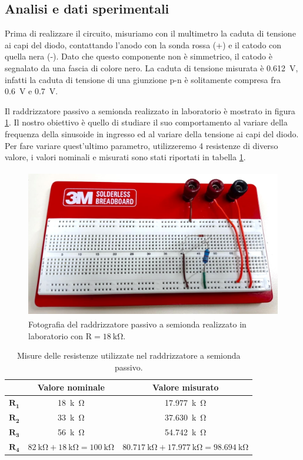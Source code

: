 \documentclass{report}
\begin{document}
\subsection{Analisi e dati sperimentali}
Prima di realizzare il circuito, misuriamo con il multimetro la caduta di tensione ai capi del diodo, contattando l'anodo con la sonda rossa (+) e il catodo con quella nera (-). Dato che questo componente non è simmetrico, il catodo è segnalato da una fascia di colore nero. La caduta di tensione misurata è \SI{0.612}{\volt}, infatti la caduta di tensione di una giunzione p-n è solitamente compresa fra \SI{0.6}{\volt} e \SI{0.7}{\volt}. \par
Il raddrizzatore passivo a semionda realizzato in laboratorio è mostrato in figura \ref{figura:circuito1}. Il nostro obiettivo è quello di studiare il suo comportamento al variare della frequenza della sinusoide in ingresso ed al variare della tensione ai capi del diodo. Per fare variare quest'ultimo parametro, utilizzeremo 4 resistenze di diverso valore, i valori nominali e misurati sono stati riportati in tabella \ref{table:misure1}. \par
\begin{figure}[h!]
	\centering
	\includegraphics[height=6.5cm]{immagini/circuito1}
	\caption{Fotografia del raddrizzatore passivo a semionda realizzato in laboratorio con $\displaystyle\mathrm{R=\SI{18}{k\ohm}}$.}
	\label{figura:circuito1}
\end{figure}
\begin{table}[h!]
	\centering
	\begin{tabular}{|c|c|c|}
		\cline{2-3} 
		\multicolumn{1}{c|}{} & \textbf{Valore nominale} & \textbf{Valore misurato}\\ 
		\hline
		$\mathbf{R_1}$ & \SI{18}{k\ohm} & \SI{17.977}{k\ohm} \\ 
		\hline
		$\mathbf{R_2}$ & \SI{33}{k\ohm} & \SI{37.630}{k\ohm} \\ 
		\hline
		$\mathbf{R_3}$ & \SI{56}{k\ohm} & \SI{54.742}{k\ohm} \\ 
		\hline
		$\mathbf{R_4}$ & $\displaystyle\mathrm{\SI{82}{k\ohm}+\SI{18}{k\ohm}=\SI{100}{k\ohm}}$ & $\displaystyle\mathrm{\SI{80.717}{k\ohm+}\SI{17.977}{k\ohm}=\SI{98.694}{k\ohm}}$ \\ 
		\hline
	\end{tabular}
	\caption{Misure delle resistenze utilizzate nel raddrizzatore a semionda passivo.}
	\label{table:misure1}
\end{table}
\end{document}

